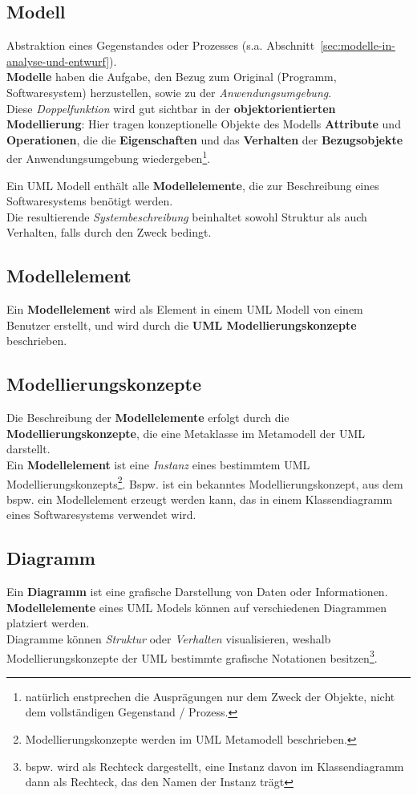 \subsection*{Modell}
Abstraktion eines Gegenstandes oder Prozesses (s.a. Abschnitt~\ref{sec:modelle-in-analyse-und-entwurf}).\\
\textbf{Modelle} haben die Aufgabe, den Bezug zum Original (Programm, Softwaresystem) herzustellen, sowie zu der \textit{Anwendungsumgebung}.\\

\noindent
Diese \textit{Doppelfunktion} wird gut sichtbar in der \textbf{objektorientierten Modellierung}: Hier tragen konzeptionelle Objekte des Modells \textbf{Attribute} und \textbf{Operationen}, die die \textbf{Eigenschaften} und das \textbf{Verhalten} der \textbf{Bezugsobjekte} der Anwendungsumgebung wiedergeben\footnote{
    natürlich enstprechen die Ausprägungen nur dem Zweck der Objekte, nicht dem vollständigen Gegenstand / Prozess.
}.

\noindent
Ein UML Modell enthält alle \textbf{Modellelemente}, die zur Beschreibung eines Softwaresystems benötigt werden.\\
Die resultierende \textit{Systembeschreibung} beinhaltet sowohl Struktur als auch Verhalten, falls durch den Zweck bedingt.

\subsection*{Modellelement}
Ein \textbf{Modellelement} wird als Element in einem UML Modell von einem Benutzer erstellt, und wird durch die \textbf{UML Modellierungskonzepte} beschrieben.

\subsection*{Modellierungskonzepte}
Die Beschreibung der \textbf{Modellelemente} erfolgt durch die \textbf{Modellierungskonzepte}, die eine Metaklasse im Metamodell der UML darstellt.\\
Ein \textbf{Modellelement} ist eine \textit{Instanz} eines bestimmtem UML Modellierungskonzepts\footnote{
Modellierungskonzepte werden im UML Metamodell beschrieben.
}.
Bspw. ist  ein bekanntes Modellierungskonzept, aus dem bspw. ein Modellelement  erzeugt werden kann, das in einem Klassendiagramm eines Softwaresystems verwendet wird.

\subsection*{Diagramm}
Ein \textbf{Diagramm} ist eine grafische Darstellung von Daten oder Informationen.\\
\textbf{Modellelemente} eines UML Models können auf verschiedenen Diagrammen platziert werden.\\
Diagramme können \textit{Struktur} oder \textit{Verhalten} visualisieren, weshalb Modellierungskonzepte der UML bestimmte grafische Notationen besitzen\footnote{
bspw. wird  als Rechteck dargestellt, eine Instanz davon im Klassendiagramm dann als Rechteck, das den Namen der Instanz trägt
}.

